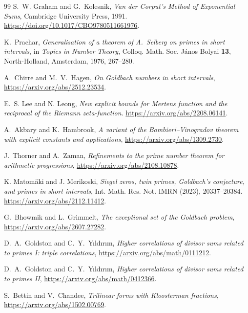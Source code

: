 \documentclass[11pt,a4paper]{article}
\numberwithin{equation}{section}
\begin{document}
{\begin{thebibliography}{99}
S.~W. Graham and G.~Kolesnik,
\newblock \emph{Van der Corput's Method of Exponential Sums},
\newblock Cambridge University Press, 1991.
\newblock \url{https://doi.org/10.1017/CBO9780511661976}.

K.~Prachar,
\newblock \emph{Generalisation of a theorem of A.~Selberg on primes
in short intervals},
\newblock in \emph{Topics in Number Theory}, Colloq. Math. Soc.
J\'anos Bolyai \textbf{13}, North-Holland, Amsterdam, 1976,
267--280.

A.~Chirre and M.~V.~Hagen,
\newblock \emph{On Goldbach numbers in short intervals},
\newblock \url{https://arxiv.org/abs/2512.23534}.

E.~S. Lee and N. Leong,
\newblock \emph{New explicit bounds for Mertens function and the
reciprocal of the Riemann zeta-function}.
\newblock \url{https://arxiv.org/abs/2208.06141}.

A.~Akbary and K.~Hambrook,
\newblock \emph{A variant of the Bombieri--Vinogradov theorem with explicit constants and applications},
\newblock \url{https://arxiv.org/abs/1309.2730}.

J.~Thorner and A.~Zaman,
\newblock \emph{Refinements to the prime number theorem for arithmetic progressions},
\newblock \url{https://arxiv.org/abs/2108.10878}.

K. Matom\"aki and J. Merikoski,
\newblock \emph{Siegel zeros, twin primes, Goldbach's conjecture,
and primes in short intervals},
\newblock Int. Math. Res. Not. IMRN (2023), 20337--20384.
\newblock \url{https://arxiv.org/abs/2112.11412}.

G.~Bhowmik and L.~Grimmelt,
\newblock \emph{The exceptional set of the Goldbach problem},
\newblock \url{https://arxiv.org/abs/2607.27282}.

D.~A.~Goldston and C.~Y.~Y{\i}ld{\i}r{\i}m,
\newblock \emph{Higher correlations of divisor sums related to primes I:
triple correlations},
\newblock \url{https://arxiv.org/abs/math/0111212}.

D.~A.~Goldston and C.~Y.~Y{\i}ld{\i}r{\i}m,
\newblock \emph{Higher correlations of divisor sums related to primes II},
\newblock \url{https://arxiv.org/abs/math/0412366}.

S.~Bettin and V.~Chandee,
\newblock \emph{Trilinear forms with Kloosterman fractions},
\newblock \url{https://arxiv.org/abs/1502.00769}.


\end{thebibliography}}
\end{document}
